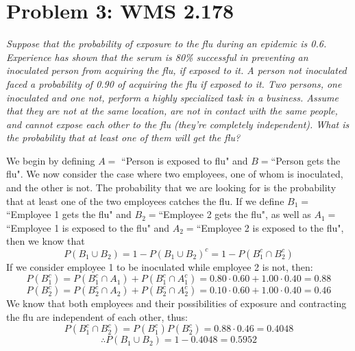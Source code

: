 \documentclass{article}
\begin{document}
	\pagebreak
	
	\section*{Problem 3: WMS 2.178}
		\emph{Suppose that the probability of exposure to the flu during an epidemic is 0.6. Experience has shown that the serum is 80\% successful in preventing an inoculated person from acquiring the flu, if exposed to it. A person not inoculated faced a probability of 0.90 of acquiring the flu if exposed to it. Two persons, one inoculated and one not, perform a highly specialized task in a business. Assume that they are not at the same location, are not in contact with the same people, and cannot expose each other to the flu (they're completely independent). What is the probability that at least one of them will get the flu?}
		
	\begin{sol}
		We begin by defining $A = $ ``Person is exposed to flu" and $B=$``Person gets the flu". We now consider the case where two employees, one of whom is inoculated, and the other is not. The probability that we are looking for is the probability that at least one of the two employees catches the flu. If we define $B_1= $``Employee 1 gets the flu" and $B_2=$``Employee 2 gets the flu", as well as $A_1=$``Employee 1 is exposed to the flu" and $A_2 =$``Employee 2 is exposed to the flu", then we know that
		$$ P (B_1 \cup B_2) = 1 - P (B_1 \cup B_2)^c = 1 - P(B_1^c \cap B_2^c)$$
		If we consider employee 1 to be inoculated while employee 2 is not, then:
		$$ P(B_1^c)= P (B_1^c \cap A_1) + P (B_1^c \cap A_1^c) = 0.80 \cdot 0.60 + 1.00 \cdot 0.40 = 0.88 $$
		$$ P(B_2^c) = P(B_2^c \cap A_2) + P(B_2^c \cap A_2^c) = 0.10 \cdot 0.60 + 1.00 \cdot 0.40 = 0.46 $$
		We know that both employees and their possibilities of exposure and contracting the flu are independent of each other, thus:
		$$ P (B_1^c \cap B_2^c) = P (B_1^c) P(B_2^c) = 0.88 \cdot 0.46 = 0.4048$$
		$$ \therefore P(B_1 \cup B_2) = 1 - 0.4048 = 0.5952$$
	\end{sol}
\end{document}
